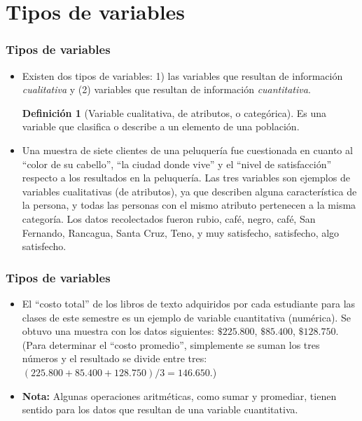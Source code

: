 \documentclass[10pt]{beamer}
\theoremstyle{plain} %
\theoremstyle{definition}
\newtheorem{defn}{Definición}
\theoremstyle{remark}
\begin{document}
\section{Tipos de variables}
\begin{frame}
\frametitle{Tipos de variables}
\begin{itemize}[<+->]
\justifying
\item Existen dos tipos de variables: 1) las variables que resultan de información \textit{cualitativa} y (2) variables que resultan de información \textit{cuantitativa}.

\begin{defn}[Variable cualitativa, de atributos, o categórica]
Es una variable que clasifica o describe a un elemento de una población.
\end{defn}
\item Una muestra de siete clientes de una peluquería fue cuestionada en cuanto al ``color de su cabello'', ``la ciudad donde vive'' y el ``nivel de satisfacción'' respecto a los resultados en la peluquería. Las tres variables son ejemplos de variables cualitativas (de atributos), ya que describen alguna característica de la persona, y todas las personas con el mismo atributo pertenecen a la misma categoría. Los datos recolectados fueron {rubio, café, negro, café}, {San Fernando, Rancagua, Santa Cruz, Teno}, y {muy satisfecho, satisfecho, algo satisfecho}.
\end{itemize}
\end{frame}


\begin{frame}
\frametitle{Tipos de variables}
\begin{itemize}[<+->]
\justifying
\begin{defn}[Variable cuantitativa o numérica]
Es una variable que cuantifica un elemento de una población.
\end{defn}

\item El ``costo total'' de los libros de texto adquiridos por cada estudiante para las clases
de este semestre es un ejemplo de variable cuantitativa (numérica). Se obtuvo
una muestra con los datos siguientes: $\$225.800$, $\$85.400$, $\$128.750$. (Para determinar
el ``costo promedio'', simplemente se suman los tres números y el resultado se divide
entre tres: $(225.800 + 85.400 + 128.750)/3 = 146.650$.)

\item \textbf{Nota:} Algunas operaciones aritméticas, como sumar y promediar, tienen sentido para los datos que resultan de una variable cuantitativa. 
\end{itemize}
\end{frame}
\end{document}
